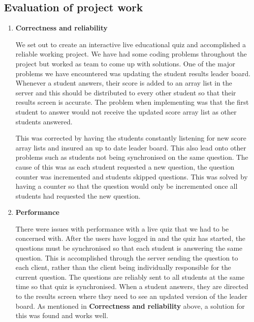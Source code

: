 \subsection{Evaluation of project work}
\label{sub:evaluation_of_project_work}

\begin{enumerate}

	\item \textbf{Correctness and reliability}

		We set out to create an interactive live educational quiz and
		accomplished a reliable working project. We have had some coding
		problems throughout the project but worked as team to come up with
		solutions. One of the major problems we have encountered was updating
		the student results leader board. Whenever a student answers, their
		score is added	to an array list in the server and this should be
		distributed to every other student so that their results screen is
		accurate. The problem when implementing was that the first student to
		answer would not receive the updated score array list as other students
		answered.

		This was corrected by having the students constantly listening for new
		score array lists and insured an up to date leader board. This also
		lead onto other problems such as students not being synchronised on the
		same question. The cause of this was as each student requested a new
		question, the question counter was incremented and students skipped
		questions. This was solved by having a counter so that the question
		would only be incremented once all students had requested the new
		question.

	\item \textbf{Performance}

		There were issues with performance with a live quiz that we had to be
		concerned with. After the users have logged in and the quiz has
		started, the questions must be synchronised so that each student is
		answering the same question. This is accomplished through the server
		sending the question to each client, rather than the client being
		individually responsible for the current question. The questions are
		reliably sent to all students at the same time so that quiz is
		synchronised. When a student answers, they are directed to the results
		screen where they need to see an updated version of the leader board.
		As mentioned in \textbf{Correctness and reliability} above, a solution
		for this was found and works well.


\end{enumerate}
